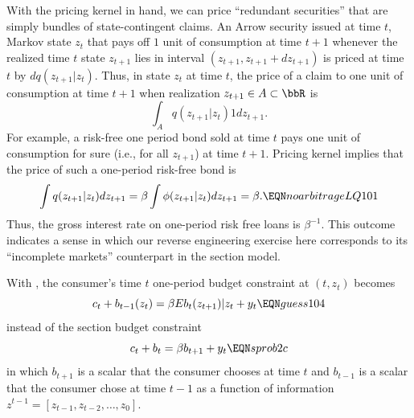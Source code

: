 With the pricing kernel in hand, we can price ``redundant securities'' that are simply bundles of 
state-contingent claims. An Arrow security issued at time $t$, Markov state $z_t$  that  pays off $1$ unit of consumption at time $t+1$ whenever the realized time $t$ state $z_{t+1}$ lies in interval $(z_{t+1}, z_{t+1}+d z_{t+1})$ is priced  at time $t$ by $d q(z_{t+1} | z_t)$. Thus,   in state $z_t $  at time $t$, the price  of a
claim to one unit of  consumption
at time $t+1$ when realization $z_{t+1} \in A \subset \bbR$ is 
$$
\int_A  q(z_{t+1} | z_t ) 1 d  z_{t+1} .
$$ 
 For example, a risk-free one period bond sold at time $t$   pays one unit of consumption for sure
  (i.e.,  for all $z_{t+1}$) at time $t+1$. %
Pricing kernel 
implies that the price of  such a   one-period risk-free bond is
$$ \int q(z_{t+1} | z_t) d z_{t+1} = \beta \int \phi(z_{t+1} | z_t) d z_{t+1} = \beta.  \EQN noarbitrageLQ101 $$
Thus,   the gross interest rate on one-period risk free loans is  $\beta^{-1}$. This outcome indicates a sense in which our reverse engineering exercise here corresponds to its ``incomplete markets'' counterpart  in the section  model. 

With   , the
consumer's time $t$ one-period budget constraint  at $(t, z_t)$   becomes
$$ c_t + b_{t-1}(z_t) = \beta E b_t(z_{t+1}) | z_t  + y_t  \EQN guess104 $$
instead of the section 
  budget constraint
$$ c_t + b_t = \beta b_{t+1}  + y_t \EQN sprob2c $$
in which  $b_{t+1}$ is a scalar that the consumer chooses at time $t$ and $b_{t-1}$ is a scalar that the consumer chose at time $t-1$
as a function of information $z^{t-1} = [z_{t-1}, z_{t-2}, \ldots, z_0]$. 


